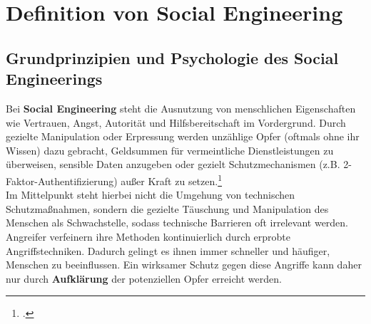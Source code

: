 \documentclass[12pt, a4paper, oneside]{scrartcl}
\begin{document}
\section{Definition von Social Engineering}

\subsection{Grundprinzipien und Psychologie des Social Engineerings}
Bei \textbf{Social Engineering} steht die Ausnutzung von menschlichen Eigenschaften wie 
Vertrauen, Angst, Autorität und Hilfsbereitschaft im Vordergrund. Durch gezielte Manipulation
oder Erpressung werden unzählige Opfer (oftmals ohne ihr Wissen) dazu gebracht, Geldsummen
für vermeintliche Dienstleistungen zu überweisen, sensible Daten anzugeben oder gezielt Schutzmechanismen
(z.B. 2-Faktor-Authentifizierung) außer Kraft zu setzen.\footcite{BSISocialEngineering}\\
Im Mittelpunkt steht hierbei nicht die Umgehung von technischen Schutzmaßnahmen, sondern die gezielte
Täuschung und Manipulation des Menschen als Schwachstelle, sodass technische Barrieren 
oft irrelevant werden. Angreifer verfeinern ihre Methoden kontinuierlich durch erprobte Angriffstechniken. 
Dadurch gelingt es ihnen immer schneller und häufiger, Menschen zu beeinflussen.
Ein wirksamer Schutz gegen diese Angriffe kann daher nur durch \textbf{Aufklärung} der 
potenziellen Opfer erreicht werden.
\end{document}
